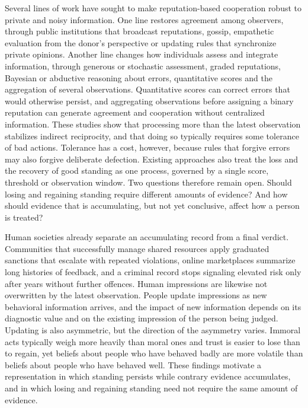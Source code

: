 \documentclass[11pt]{article}
\begin{document}
Several lines of work have sought to make reputation-based cooperation robust to private and noisy information. One line restores agreement among observers, through public institutions that broadcast reputations\cite{radzvilavicius2021}, gossip\cite{kawakatsu2024}, empathetic evaluation from the donor's perspective\cite{radzvilavicius2019} or updating rules that synchronize private opinions\cite{murase2024synchronization,tham2026,okada2024}. Another line changes how individuals assess and integrate information, through generous or stochastic assessment\cite{schmid2021,murase2023}, graded reputations\cite{tanabe2013,murase2022}, Bayesian or abductive reasoning about errors\cite{pandula2024,morsky2024}, quantitative scores\cite{schmid2023,clark2020} and the aggregation of several observations\cite{michelmata2024}. Quantitative scores can correct errors that would otherwise persist\cite{schmid2023}, and aggregating observations before assigning a binary reputation can generate agreement and cooperation without centralized information\cite{michelmata2024}. These studies show that processing more than the latest observation stabilizes indirect reciprocity, and that doing so typically requires some tolerance of bad actions\cite{clark2020,michelmata2024,okada2017}. Tolerance has a cost, however, because rules that forgive errors may also forgive deliberate defection\cite{schmid2021,michelmata2024}. Existing approaches also treat the loss and the recovery of good standing as one process, governed by a single score, threshold or observation window\cite{schmid2023,michelmata2024,yamamoto2025}. Two questions therefore remain open. Should losing and regaining standing require different amounts of evidence? And how should evidence that is accumulating, but not yet conclusive, affect how a person is treated?

Human societies already separate an accumulating record from a final verdict. Communities that successfully manage shared resources apply graduated sanctions that escalate with repeated violations\cite{ostrom1990,cox2010}, online marketplaces summarize long histories of feedback\cite{tadelis2016}, and a criminal record stops signaling elevated risk only after years without further offences\cite{blumstein2009}. Human impressions are likewise not overwritten by the latest observation. People update impressions as new behavioral information arrives\cite{yamamoto2025,mendesiedlecki2013neural}, and the impact of new information depends on its diagnostic value and on the existing impression of the person being judged\cite{mendesiedlecki2013diagnostic,siegel2018}. Updating is also asymmetric, but the direction of the asymmetry varies. Immoral acts typically weigh more heavily than moral ones\cite{mendesiedlecki2013diagnostic,skowronski1989} and trust is easier to lose than to regain\cite{slovic1993}, yet beliefs about people who have behaved badly are more volatile than beliefs about people who have behaved well\cite{siegel2018}. These findings motivate a representation in which standing persists while contrary evidence accumulates, and in which losing and regaining standing need not require the same amount of evidence.
\end{document}

